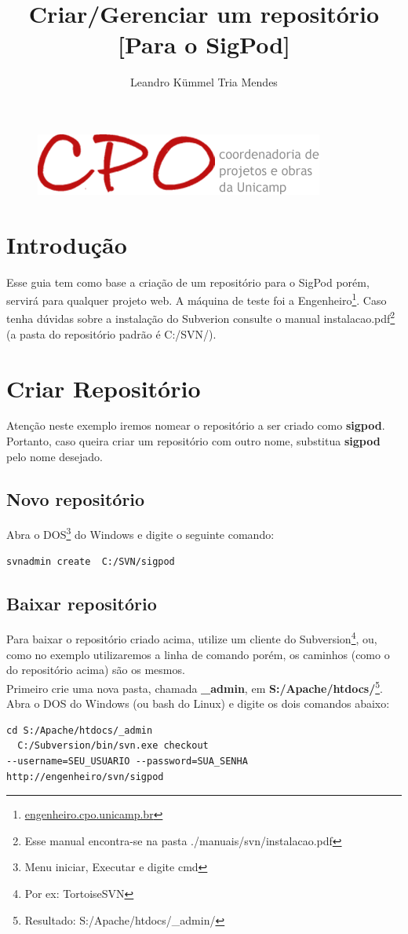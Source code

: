\documentclass[a4paper,10pt]{article}
\title{Criar/Gerenciar um repositório [Para o SigPod]}
\author{Leandro Kümmel Tria Mendes}
\begin{document}
\maketitle
\begin{figure}[!htb]
  \centering
  \includegraphics[scale=0.5]{logo.png}
\end{figure}
\newpage
\tableofcontents
\section{Introdução}
Esse guia tem como base a criação de um repositório para o SigPod porém, servirá para qualquer projeto web. A máquina de teste foi a Engenheiro\footnote{\url{engenheiro.cpo.unicamp.br}}. Caso tenha dúvidas sobre a instalação do Subverion consulte o manual instalacao.pdf\footnote{Esse manual encontra-se na pasta ./manuais/svn/instalacao.pdf} (a pasta do repositório padrão é C:/SVN/).
\section{Criar Repositório}
Atenção neste exemplo iremos nomear o repositório a ser criado como \textbf{sigpod}. Portanto, caso queira criar um repositório com outro nome, substitua \textbf{sigpod} pelo nome desejado.
\subsection{Novo repositório} \label{itm:novorepo}
Abra o DOS\footnote{Menu iniciar, Executar e digite cmd} do Windows e digite o seguinte comando:
\begin{lstlisting}[caption={Criar repositório}]
  svnadmin create  C:/SVN/sigpod
\end{lstlisting}
\subsection{Baixar repositório} \label{itm:corepo}
Para baixar o repositório criado acima, utilize um cliente do Subversion\footnote{Por ex: TortoiseSVN}, ou, como no exemplo utilizaremos a linha de comando porém, os caminhos (como o do repositório acima) são os mesmos.\\
Primeiro crie uma nova pasta, chamada \textbf{\_admin}, em \textbf{S:/Apache/htdocs/}\footnote{Resultado: S:/Apache/htdocs/\_admin/}.\\Abra o DOS do Windows (ou bash do Linux) e digite os dois comandos abaixo:
\begin{lstlisting}[caption={processo de checkout}]
  cd S:/Apache/htdocs/_admin
  C:/Subversion/bin/svn.exe checkout 
--username=SEU_USUARIO --password=SUA_SENHA 
http://engenheiro/svn/sigpod
\end{lstlisting}
\end{document}
